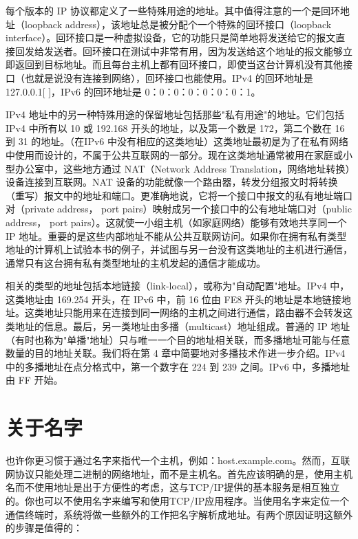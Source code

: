 		每个版本的 IP 协议都定义了一些特殊用途的地址。其中值得注意的一个是回环地址（loopback address），该地址总是被分配个一个特殊的回环接口（loopback interface）。回环接口是一种虚拟设备，它的功能只是简单地将发送给它的报文直接回发给发送者。回环接口在测试中非常有用，因为发送给这个地址的报文能够立即返回到目标地址。而且每台主机上都有回环接口，即使当这台计算机没有其他接口（也就是说没有连接到网络），回环接口也能使用。IPv4 的回环地址是 127.0.0.1[ ]，IPv6 的回环地址是 0：0：0：0：0：0：0：1。

		IPv4 地址中的另一种特殊用途的保留地址包括那些"私有用途"的地址。它们包括 IPv4 中所有以 10 或 192.168 开头的地址，以及第一个数是 172，第二个数在 16 到 31 的地址。（在IPv6 中没有相应的这类地址）这类地址最初是为了在私有网络中使用而设计的，不属于公共互联网的一部分。现在这类地址通常被用在家庭或小型办公室中，这些地方通过 NAT（Network Address Translation，网络地址转换）设备连接到互联网。NAT 设备的功能就像一个路由器，转发分组报文时将转换（重写）报文中的地址和端口。更准确地说，它将一个接口中报文的私有地址端口对（private address， port pairs）映射成另一个接口中的公有地址端口对（public address， port pairs）。这就使一小组主机（如家庭网络）能够有效地共享同一个 IP 地址。重要的是这些内部地址不能从公共互联网访问。如果你在拥有私有类型地址的计算机上试验本书的例子，并试图与另一台没有这类地址的主机进行通信，通常只有这台拥有私有类型地址的主机发起的通信才能成功。

		相关的类型的地址包括本地链接（link-local），或称为"自动配置"地址。IPv4 中，这类地址由 169.254 开头，在 IPv6 中，前 16 位由 FE8 开头的地址是本地链接地址。这类地址只能用来在连接到同一网络的主机之间进行通信，路由器不会转发这类地址的信息。最后，另一类地址由多播（multicast）地址组成。普通的 IP 地址（有时也称为"单播"地址）只与唯一一个目的地址相关联，而多播地址可能与任意数量的目的地址关联。我们将在第 4 章中简要地对多播技术作进一步介绍。IPv4 中的多播地址在点分格式中，第一个数字在 224 到 239 之间。IPv6 中，多播地址由 FF 开始。 

	\section{关于名字}

		也许你更习惯于通过名字来指代一个主机，例如：host.example.com。然而，互联网协议只能处理二进制的网络地址，而不是主机名。首先应该明确的是，使用主机名而不使用地址是出于方便性的考虑，这与TCP/IP提供的基本服务是相互独立的。你也可以不使用名字来编写和使用TCP/IP应用程序。当使用名字来定位一个通信终端时，系统将做一些额外的工作把名字解析成地址。有两个原因证明这额外的步骤是值得的：

